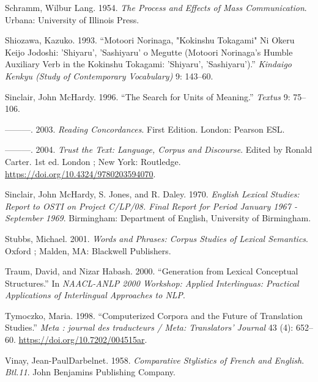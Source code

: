 \documentclass[
  letterpaper,
  DIV=11,
  numbers=noendperiod]{scrartcl}
\newlength{\cslhangindent}
\newenvironment{CSLReferences}[2] %
 {\begin{list}{}{%
  \setlength{\itemindent}{0pt}
  \setlength{\leftmargin}{0pt}
  \setlength{\parsep}{0pt}
  \ifodd #1
   \setlength{\leftmargin}{\cslhangindent}
   \setlength{\itemindent}{-1\cslhangindent}
  \fi
  \setlength{\itemsep}{#2\baselineskip}}}
 {\end{list}}
\begin{document}
\begin{CSLReferences}{1}{0}
Schramm, Wilbur Lang. 1954. \emph{The Process and Effects of Mass
Communication}. Urbana: University of Illinois Press.

Shiozawa, Kazuko. 1993. {``Motoori {Norinaga}, "{Kokinshu Tokagami}" Ni
Okeru Keijo Jodoshi: 'Shiyaru', 'Sashiyaru' o Megutte ({Motoori
Norinaga}'s Humble Auxiliary Verb in the {Kokinshu Tokagami}: 'Shiyaru',
'Sashiyaru').''} \emph{Kindaigo Kenkyu (Study of Contemporary
Vocabulary)} 9: 143--60.

Sinclair, John McHardy. 1996. {``The {Search} for {Units} of
{Meaning}.''} \emph{Textus} 9: 75--106.

---------. 2003. \emph{Reading {Concordances}}. First Edition. London:
Pearson ESL.

---------. 2004. \emph{Trust the {Text}: {Language}, {Corpus} and
{Discourse}}. Edited by Ronald Carter. 1st ed. London ; New York:
Routledge. \url{https://doi.org/10.4324/9780203594070}.

Sinclair, John McHardy, S. Jones, and R. Daley. 1970. \emph{English
Lexical Studies: Report to {OSTI} on Project {C}/{LP}/08. {Final} Report
for Period {January} 1967 - {September} 1969}. Birmingham: Department of
English, University of Birmingham.

Stubbs, Michael. 2001. \emph{Words and Phrases: Corpus Studies of
Lexical Semantics}. Oxford ; Malden, MA: Blackwell Publishers.

Traum, David, and Nizar Habash. 2000. {``Generation from {Lexical
Conceptual Structures}.''} In \emph{{NAACL-ANLP} 2000 {Workshop}:
{Applied Interlinguas}: {Practical Applications} of {Interlingual
Approaches} to {NLP}}.

Tymoczko, Maria. 1998. {``{Computerized Corpora and the Future of
Translation Studies}.''} \emph{Meta : journal des traducteurs / Meta:
Translators' Journal} 43 (4): 652--60.
\url{https://doi.org/10.7202/004515ar}.

Vinay, Jean-PaulDarbelnet. 1958. \emph{Comparative {Stylistics} of
{French} and {English}}. \emph{Btl.11}. John Benjamins Publishing
Company.


\end{CSLReferences}
\end{document}
